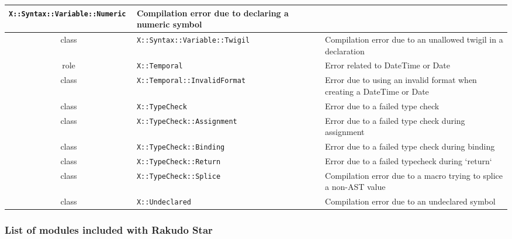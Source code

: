 \documentclass[17pt,english]{extarticle}
\providecommand{\tabularnewline}{\\}
\begin{document}
\begin{longtable}{|c||>{\centering}p{}||>{\centering}p{}|}
\texttt{X::Syntax::Variable::Numeric } &
Compilation error due to declaring a numeric symbol\tabularnewline
\hline 
\hline 
class  &
\texttt{X::Syntax::Variable::Twigil } &
Compilation error due to an unallowed twigil in a declaration\tabularnewline
\hline 
\hline 
role  &
\texttt{X::Temporal } &
Error related to DateTime or Date\tabularnewline
\hline 
\hline 
class  &
\texttt{X::Temporal::InvalidFormat } &
Error due to using an invalid format when creating a DateTime or Date\tabularnewline
\hline 
\hline 
class  &
\texttt{X::TypeCheck } &
Error due to a failed type check\tabularnewline
\hline 
\hline 
class  &
\texttt{X::TypeCheck::Assignment } &
Error due to a failed type check during assignment\tabularnewline
\hline 
\hline 
class  &
\texttt{X::TypeCheck::Binding } &
Error due to a failed type check during binding\tabularnewline
\hline 
\hline 
class  &
\texttt{X::TypeCheck::Return } &
Error due to a failed typecheck during `return`\tabularnewline
\hline 
\hline 
class  &
\texttt{X::TypeCheck::Splice } &
Compilation error due to a macro trying to splice a non-AST value\tabularnewline
\hline 
\hline 
class  &
\texttt{X::Undeclared } &
Compilation error due to an undeclared symbol\tabularnewline
\hline 
\end{longtable}


\subsubsection*{List of modules included with Rakudo Star}
\end{document}
